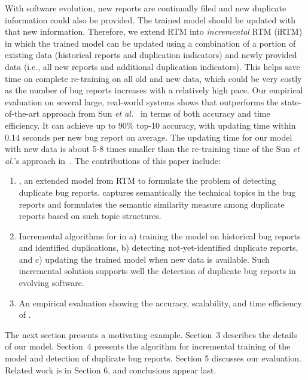 
With software evolution, new reports are continually filed and new
duplicate information could also be provided. The trained model should
be updated with that new information. Therefore, we extend RTM into
{\em incremental} RTM (iRTM) in which the trained model can be updated
using a combination of a portion of existing data (historical reports
and duplication indicators) and newly provided data (i.e., all new
reports and additional duplication indicators). This helps save time
on complete re-training on all old and new data, which could be very
costly as the number of bug reports increases with a relatively high
pace.
%
%
Our empirical evaluation on several large, real-world systems shows
that {\model} outperforms the state-of-the-art approach from Sun {\em
et al.}~\cite{davidlo10} in terms of both accuracy and time
efficiency. It can achieve up to 90\% top-10 accuracy, with updating
time within 0.14 seconds per new bug report on average. The updating
time for our model with new data is about 5-8 times smaller than the
re-training time of the Sun {\em et al.}'s approach
in~\cite{davidlo10}. The contributions of this paper include:

\begin{enumerate}

\item {\model}, an extended model from RTM to formulate the problem of
detecting duplicate bug reports.
{\model} captures semantically the technical topics in the bug reports
and formulates the semantic similarity measure among duplicate reports
based on such topic structures.

\item Incremental algorithms for {\model} in a) training the model on
historical bug reports and identified duplications, b) detecting
not-yet-identified duplicate reports, and c) updating the trained
model when new data is available. Such incremental solution supports
well the detection of duplicate bug reports in evolving software.

\item An empirical evaluation showing the accuracy, scalability, and
time efficiency of {\model}.

\end{enumerate}

The next section presents a motivating example. Section~3 describes
the details of our model. Section~4 presents the algorithm for
incremental training of the model and detection of duplicate bug
reports. Section 5 discusses our evaluation. Related work is in
Section 6, and conclusions appear last.
